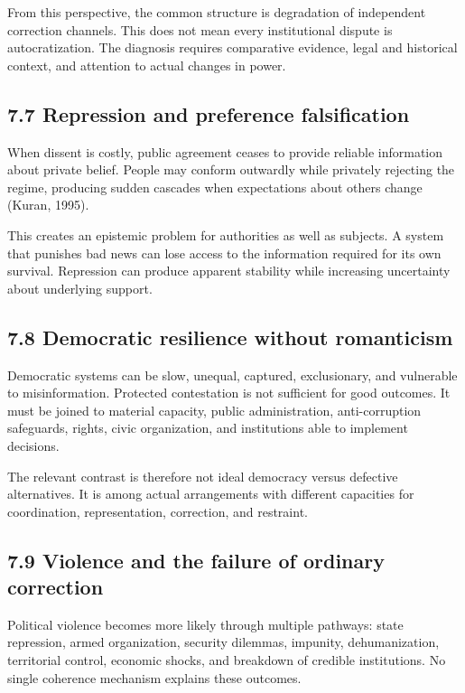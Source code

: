 \documentclass[
  11pt,
]{article}
\begin{document}
From this perspective, the common structure is degradation of
independent correction channels. This does not mean every institutional
dispute is autocratization. The diagnosis requires comparative evidence,
legal and historical context, and attention to actual changes in power.

\subsection{7.7 Repression and preference
falsification}\label{repression-and-preference-falsification}

When dissent is costly, public agreement ceases to provide reliable
information about private belief. People may conform outwardly while
privately rejecting the regime, producing sudden cascades when
expectations about others change (Kuran, 1995).

This creates an epistemic problem for authorities as well as subjects. A
system that punishes bad news can lose access to the information
required for its own survival. Repression can produce apparent stability
while increasing uncertainty about underlying support.

\subsection{7.8 Democratic resilience without
romanticism}\label{democratic-resilience-without-romanticism}

Democratic systems can be slow, unequal, captured, exclusionary, and
vulnerable to misinformation. Protected contestation is not sufficient
for good outcomes. It must be joined to material capacity, public
administration, anti-corruption safeguards, rights, civic organization,
and institutions able to implement decisions.

The relevant contrast is therefore not ideal democracy versus defective
alternatives. It is among actual arrangements with different capacities
for coordination, representation, correction, and restraint.

\subsection{7.9 Violence and the failure of ordinary
correction}\label{violence-and-the-failure-of-ordinary-correction}

Political violence becomes more likely through multiple pathways: state
repression, armed organization, security dilemmas, impunity,
dehumanization, territorial control, economic shocks, and breakdown of
credible institutions. No single coherence mechanism explains these
outcomes.
\end{document}

